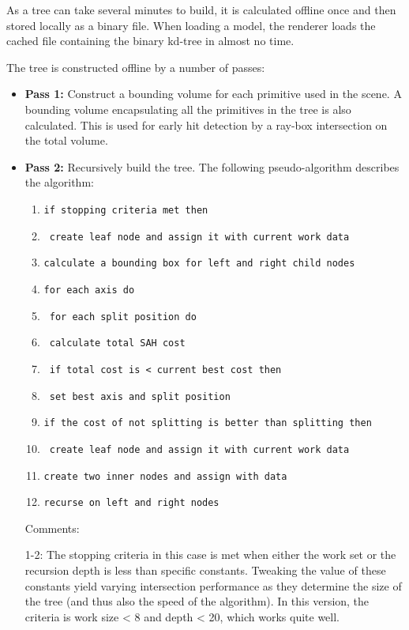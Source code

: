 As a tree can take several minutes to build, it is calculated offline once and then stored locally as a binary file. When loading a model, the renderer loads the cached file containing the binary kd-tree in almost no time.

The tree is constructed offline by a number of passes:
\begin{itemize}
  \item \textbf{Pass 1:} Construct a bounding volume for each primitive used in the scene. A bounding volume encapsulating all the primitives in the tree is also calculated. This is used for early hit detection by a ray-box intersection on the total volume.
  \item \textbf{Pass 2:} Recursively build the tree. The following pseudo-algorithm describes the algorithm:


\begin{enumerate}
	\item \texttt{if stopping criteria met then }
	\item \texttt{  create leaf node and assign it with current work data}
	\item \texttt{calculate a bounding box for left and right child nodes}
	\item \texttt{for each axis do}
	\item \texttt{ for each split position do}
	\item \texttt{   calculate total SAH cost}
	\item \texttt{   if total cost is < current best cost then}
	\item \texttt{     set best axis and split position}
	\item \texttt{if the cost of not splitting is better than splitting then}
	\item \texttt{  create leaf node and assign it with current work data}
	\item \texttt{create two inner nodes and assign with data}
	\item \texttt{recurse on left and right nodes}
\end{enumerate}


  Comments: 

  1-2: The stopping criteria in this case is met when either the work set or the recursion depth is less than specific constants. Tweaking the value of these constants yield varying intersection performance as they determine the size of the tree (and thus also the speed of the algorithm). In this version, the criteria is work size < 8 and depth < 20, which works quite well. 


\end{itemize}

